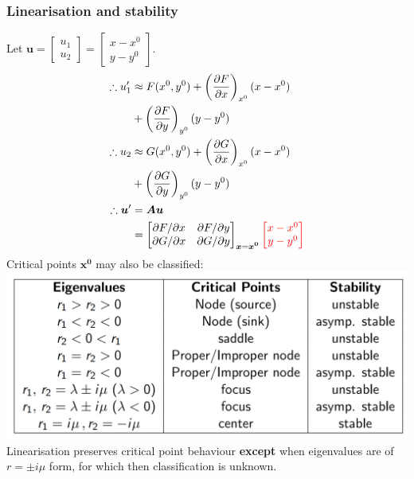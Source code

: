 \documentclass{article}
\begin{document}
\begin{multicols}{3}
\subsubsection*{Linearisation and stability}
Let $\boldsymbol{u}=\begin{bmatrix} u_1 \\ u_2 \end{bmatrix}
=\begin{bmatrix} x-x^0 \\ y-y^0 \end{bmatrix}$.
\begin{align*}
    \therefore u_1'
    &\approx F(x^0, y^0)+\left(\frac{\partial F}{\partial x}\right)_{x^0}(x-x^0) \\
    &+\left(\frac{\partial F}{\partial y}\right)_{y^0}(y-y^0) \\
    \therefore u_2 
    &\approx G(x^0, y^0)+\left(\frac{\partial G}{\partial x}\right)_{x^0}(x-x^0) \\
    &+\left(\frac{\partial G}{\partial y}\right)_{y^0}(y-y^0) \\
    \therefore\boldsymbol{u}' &= \boldsymbol{A}\boldsymbol{u} \\
    &=\begin{bmatrix}
        \partial F/\partial x & \partial F/\partial y \\
        \partial G/\partial x & \partial G/\partial y
    \end{bmatrix}_{\boldsymbol{x} = \boldsymbol{x^0}}
    \textcolor{red}{\begin{bmatrix} x-x^0 \\ y-y^0 \end{bmatrix}}
\end{align*}
Critical points $\boldsymbol{x^0}$ may also be classified: \\
\includegraphics[scale=0.3]{f1.png}
Linearisation preserves critical point behaviour \textbf{except} when eigenvalues are of $r=\pm i\mu$ form,
for which then classification is unknown.


\end{multicols}
\end{document}
